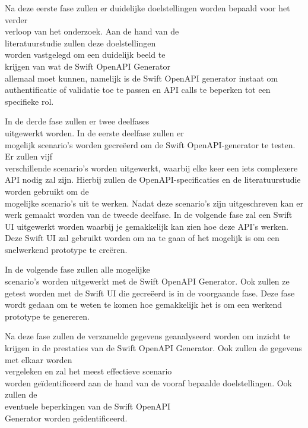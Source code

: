 Na deze eerste fase zullen er duidelijke doelstellingen worden bepaald voor het verder \\verloop van het onderzoek. Aan de hand van de \\literatuurstudie zullen deze doelstellingen \\worden vastgelegd om een duidelijk beeld te \\krijgen van wat de Swift OpenAPI Generator \\allemaal moet kunnen, namelijk is de Swift OpenAPI generator instaat om authentificatie of validatie toe te passen en API calls te beperken tot een \\specifieke rol. 

In de derde fase zullen er twee deelfases \\uitgewerkt worden. In de eerste deelfase zullen er \\mogelijk scenario's worden gecreëerd om de Swift OpenAPI-generator te testen. Er zullen vijf \\verschillende scenario's worden uitgewerkt, waarbij elke keer een iets complexere API nodig zal zijn. Hierbij zullen de OpenAPI-specificaties en de literatuurstudie worden gebruikt om de \\mogelijke scenario's uit te werken. Nadat deze scenario’s zijn uitgeschreven kan er werk gemaakt worden van de tweede deelfase. In de volgende fase zal een Swift UI uitgewerkt worden waarbij je gemakkelijk kan zien hoe deze API’s werken. Deze Swift UI zal gebruikt worden om na te gaan of het mogelijk is om een snelwerkend prototype te creëren. 

In de volgende fase zullen alle mogelijke \\scenario’s worden uitgewerkt met de Swift OpenAPI Generator. Ook zullen ze getest worden met de Swift UI die gecreëerd is in de voorgaande fase. Deze fase wordt gedaan om te weten te komen hoe gemakkelijk het is om een werkend \\prototype te genereren. 

Na deze fase zullen de verzamelde gegevens geanalyseerd worden om inzicht te krijgen in de prestaties van de Swift OpenAPI Generator. Ook zullen de gegevens met elkaar worden \\vergeleken en zal het meest effectieve scenario \\worden geïdentificeerd aan de hand van de vooraf bepaalde doelstellingen. Ook zullen de \\eventuele beperkingen van de Swift OpenAPI \\Generator worden geïdentificeerd.

